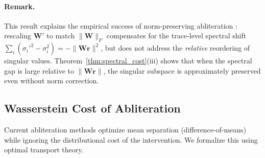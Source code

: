 \paragraph{Remark.}
This result explains the empirical success of norm-preserving abliteration \citep{grimjim2025}: rescaling $\mathbf{W}'$ to match $\|\mathbf{W}\|_F$ compensates for the trace-level spectral shift $\sum_i (\sigma_i'^2 - \sigma_i^2) = -\|\mathbf{W}\mathbf{r}\|^2$, but does not address the \emph{relative} reordering of singular values.
Theorem~\ref{thm:spectral_cost}(iii) shows that when the spectral gap is large relative to $\|\mathbf{W}\mathbf{r}\|$, the singular subspace is approximately preserved even without norm correction.

\subsection{Wasserstein Cost of Abliteration}
\label{app:wasserstein}

Current abliteration methods optimize mean separation (difference-of-means) while ignoring the distributional cost of the intervention.
We formalize this using optimal transport theory.

